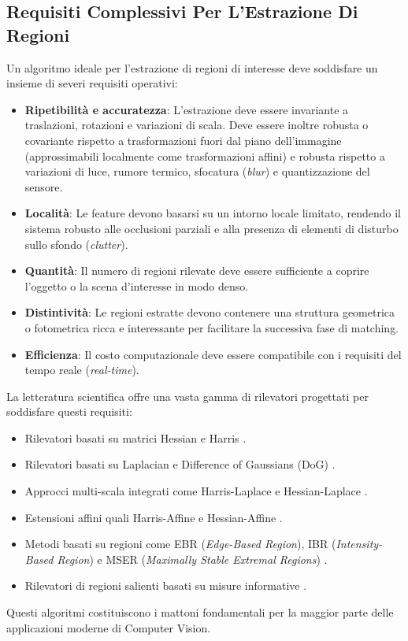 ﻿\documentclass[11pt, a4paper]{article}
\begin{document}
\subsection{Requisiti Complessivi Per L'Estrazione Di Regioni}

Un algoritmo ideale per l'estrazione di regioni di interesse deve soddisfare un insieme di severi requisiti operativi:
\begin{itemize}
    \item \textbf{Ripetibilità e accuratezza}: L'estrazione deve essere \textcolor{theoryblue}{invariante} a traslazioni, rotazioni e variazioni di scala. Deve essere inoltre \textcolor{theoryblue}{robusta o covariante} rispetto a trasformazioni fuori dal piano dell'immagine (approssimabili localmente come trasformazioni affini) e \textcolor{theoryblue}{robusta} rispetto a variazioni di luce, rumore termico, sfocatura (\emph{blur}) e quantizzazione del sensore.
    \item \textbf{Località}: Le feature devono basarsi su un intorno locale limitato, rendendo il sistema robusto alle occlusioni parziali e alla presenza di elementi di disturbo sullo sfondo (\emph{clutter}).
    \item \textbf{Quantità}: Il numero di regioni rilevate deve essere sufficiente a coprire l'oggetto o la scena d'interesse in modo denso.
    \item \textbf{Distintività}: Le regioni estratte devono contenere una struttura geometrica o fotometrica ricca e interessante per facilitare la successiva fase di matching.
    \item \textbf{Efficienza}: Il costo computazionale deve essere compatibile con i requisiti del tempo reale (\emph{real-time}).
\end{itemize}

La letteratura scientifica offre una vasta gamma di rilevatori progettati per soddisfare questi requisiti:
\begin{itemize}
    \item Rilevatori basati su matrici Hessian e Harris \cite{Beaudet78, Harris88}.
    \item Rilevatori basati su Laplacian e Difference of Gaussians (DoG) \cite{Lindeberg98, Lowe99}.
    \item Approcci multi-scala integrati come Harris-Laplace e Hessian-Laplace \cite{MikolajczykSchmid01}.
    \item Estensioni affini quali Harris-Affine e Hessian-Affine \cite{MikolajczykSchmid04}.
    \item Metodi basati su regioni come EBR (\emph{Edge-Based Region}), IBR (\emph{Intensity-Based Region}) \cite{TuytelaarsVanGool04} e MSER (\emph{Maximally Stable Extremal Regions}) \cite{Matas02}.
    \item Rilevatori di regioni salienti basati su misure informative \cite{KadirBrady01}.
\end{itemize}
Questi algoritmi costituiscono i mattoni fondamentali per la maggior parte delle applicazioni moderne di Computer Vision.
\end{document}
